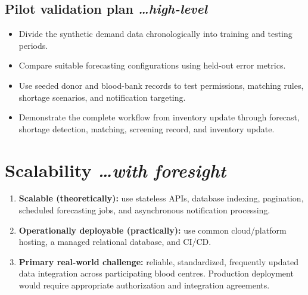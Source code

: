 \documentclass[11pt,a4paper]{article}
\newcommand{\BvrHint}[1]{{\normalfont\normalsize\itshape\hfill #1}}
\begin{document}
\subsection{Pilot validation plan \BvrHint{\ldots high-level}}
\begin{itemize}[leftmargin=0.7cm]
\item Divide the synthetic demand data chronologically into training and testing periods.
\item Compare suitable forecasting configurations using held-out error metrics.
\item Use seeded donor and blood-bank records to test permissions, matching rules, shortage scenarios, and notification targeting.
\item Demonstrate the complete workflow from inventory update through forecast, shortage detection, matching, screening record, and inventory update.
\end{itemize}

\section{Scalability \BvrHint{\ldots with foresight}}
\begin{enumerate}[leftmargin=0.7cm]
\item \textbf{Scalable (theoretically):} use stateless APIs, database indexing, pagination, scheduled forecasting jobs, and asynchronous notification processing.
\item \textbf{Operationally deployable (practically):} use common cloud/platform hosting, a managed relational database, and CI/CD.
\item \textbf{Primary real-world challenge:} reliable, standardized, frequently updated data integration across participating blood centres. Production deployment would require appropriate authorization and integration agreements.
\end{enumerate}
\end{document}
